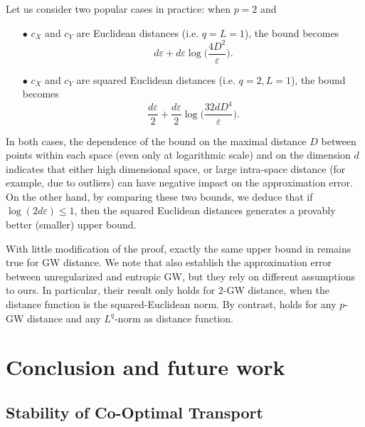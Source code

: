 Let us consider two popular cases in practice: when $p=2$ and
\begin{itemize}
  \item[$\bullet$] $c_X$ and $c_Y$ are Euclidean distances (i.e. $q=L=1$), the bound becomes
  \begin{equation}
    d \varepsilon + d\varepsilon \log\Big( \frac{4D^2}{\varepsilon} \Big).
  \end{equation}

  \item[$\bullet$] $c_X$ and $c_Y$ are squared Euclidean distances (i.e. $q=2, L=1$),
  the bound becomes
  \begin{equation}
    \frac{d \varepsilon}{2} + \frac{d\varepsilon}{2} \log\Big( \frac{32dD^4}{\varepsilon} \Big).
  \end{equation}
\end{itemize}
In both cases, the dependence of the bound on the maximal distance $D$ between points
within each space (even only at logarithmic scale) and on the dimension $d$ indicates
that either high dimensional space, or large intra-space distance (for example, due to outliers)
can have negative impact on the approximation error. On the other hand,
by comparing these two bounds, we deduce that if $\log(2d \varepsilon) \leq 1$,
then the squared Euclidean distances generates a provably better (smaller) upper bound.

With little modification of the proof, exactly the same upper bound in 
remains true for GW distance. We note that \citep{Zhang23} also establish the
approximation error between unregularized and entropic GW, but they rely on different assumptions
to ours. In particular, their result only holds for $2$-GW distance,
when the distance function is the squared-Euclidean norm. By contrast,
 holds for any $p$-GW distance and any $L^q$-norm as distance function.

\section{Conclusion and future work}

\subsection{Stability of Co-Optimal Transport}

